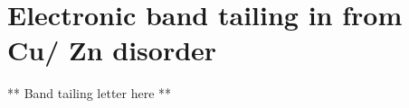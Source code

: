 \documentclass[11pt, twoside]{report}
\begin{document}
\section{Electronic band tailing in {\CZTS} from Cu/ Zn disorder}\label{eris_band_tailing}

** Band tailing letter here **\\
\end{document}
